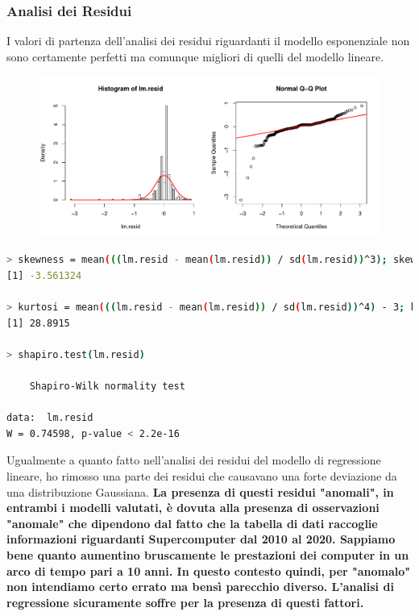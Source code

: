 \documentclass[11pt,a4paper]{article}
\begin{document}
\subsubsection{Analisi dei Residui}
I valori di partenza dell'analisi dei residui riguardanti il modello
esponenziale non sono certamente perfetti ma comunque migliori di quelli del
modello lineare.
\begin{figure}[H]
	\hspace{-1.5cm}
	\includegraphics[scale=0.7]{imgs/residuals_exp.pdf}
\end{figure}
\vspace{-0.8cm}
\begin{lstlisting}[language=bash,basicstyle=\tiny,tabsize=2,frame = single]
> skewness = mean(((lm.resid - mean(lm.resid)) / sd(lm.resid))^3); skewness
[1] -3.561324

> kurtosi = mean(((lm.resid - mean(lm.resid)) / sd(lm.resid))^4) - 3; kurtosi
[1] 28.8915

> shapiro.test(lm.resid)

	Shapiro-Wilk normality test

data:  lm.resid
W = 0.74598, p-value < 2.2e-16
\end{lstlisting}
Ugualmente a quanto fatto nell'analisi dei residui del modello di regressione
lineare, ho rimosso una parte dei residui che causavano una forte deviazione da
una distribuzione Gaussiana. \textbf{La presenza di questi residui "anomali", in
entrambi i modelli valutati, \`e dovuta alla presenza di osservazioni "anomale"
che dipendono dal fatto che la tabella di dati raccoglie informazioni
riguardanti Supercomputer dal 2010 al 2020. Sappiamo bene quanto aumentino
bruscamente le prestazioni dei computer in un arco di tempo pari a 10 anni. In
questo contesto quindi, per "anomalo" non intendiamo certo errato ma bens\`i
parecchio diverso. L'analisi di regressione sicuramente soffre per la presenza
di questi fattori.}
\end{document}
